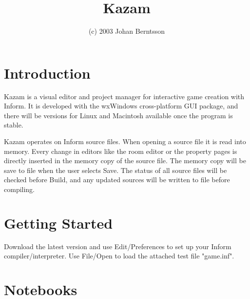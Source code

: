 %
\parskip=10pt%
\parindent=0pt%
\title{Kazam}%
\author{(c) 2003 Johan Berntsson}%
\makeindex%
%
\maketitle%
\pagestyle{fancyplain}%
%
%
%
\setfooter{\thepage}{}{}{}{}{\thepage}%
\tableofcontents%

\chapter{Introduction}\label{introduction}
%
%
\setfooter{\thepage}{}{}{}{}{\thepage}%

Kazam is a visual editor and project manager for interactive game creation with Inform.
It is developed with the wxWindows cross-platform GUI package, and there will be versions
for Linux and Macintosh available once the program is stable.

Kazam operates on Inform source files. When opening a source file it is read into
memory. Every change in editors like the room editor or the property pages is directly
inserted in the memory copy of the source file. The memory copy will be save to file
when the user selects Save. The status of all source files will be checked before Build,
and any updated sources will be written to file before compiling. 

\chapter{Getting Started}\label{gettingstarted}
%
%
\setfooter{\thepage}{}{}{}{}{\thepage}%
Download the latest version and use Edit/Preferences to set up your Inform compiler/interpreter. Use File/Open
to load the attached test file "game.inf". 

\chapter{Notebooks}\label{notebooks}
%
%
\setfooter{\thepage}{}{}{}{}{\thepage}%

